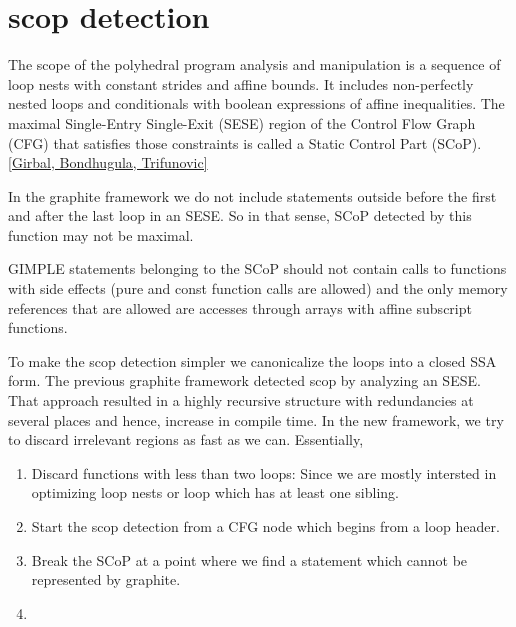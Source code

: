 


\section{scop detection}
The scope of the polyhedral program analysis and manipulation is a sequence of loop
nests with constant strides and affine bounds. It includes non-perfectly nested loops
and conditionals with boolean expressions of affine inequalities.
The maximal Single-Entry Single-Exit (SESE) region of the Control Flow Graph
(CFG) that satisfies those constraints is called a Static Control Part (SCoP). \ref{Girbal, Bondhugula, Trifunovic}

In the graphite framework we do not include statements outside before the first and after the last loop in an SESE.
So in that sense, SCoP detected by this function may not be maximal.

GIMPLE statements belonging to the SCoP should not contain calls to functions with
side effects (pure and const function calls are allowed) and the only memory references
that are allowed are accesses through arrays with affine subscript functions.

To make the scop detection simpler we canonicalize the loops into a closed SSA form.
The previous graphite framework detected scop by analyzing an SESE. That approach resulted in a highly recursive structure
with redundancies at several places and hence, increase in compile time. In the new framework, we try to discard irrelevant
regions as fast as we can. Essentially,
\begin{enumerate}
\item Discard functions with less than two loops: Since we are mostly intersted in optimizing loop nests
or loop which has at least one sibling.
\item Start the scop detection from a CFG node which begins from a loop header.
\item Break the SCoP at a point where we find a statement which cannot be represented by graphite.
\item 
\end{enumerate}


